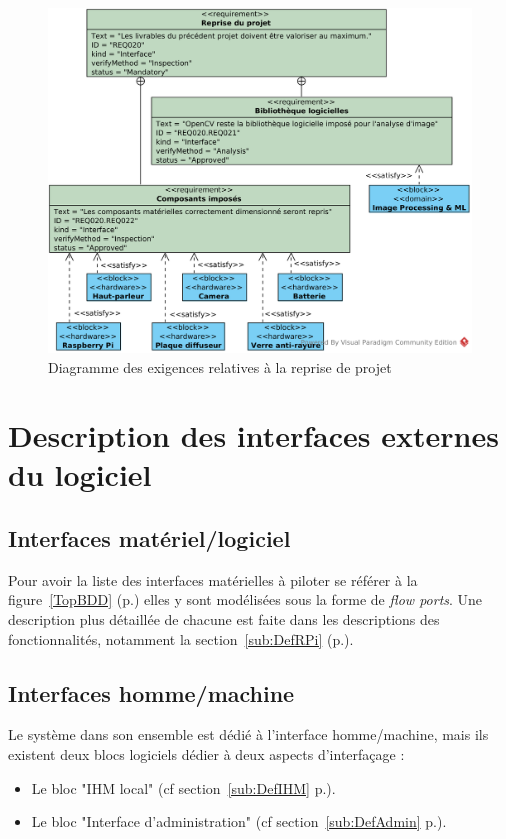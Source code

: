 \begin{figure}[H]
    \centering
    \includegraphics[scale=0.75]{img/SysML_Project_RD.png}
    \caption{Diagramme des exigences relatives à la reprise de projet}
    \label{RDProject}
\end{figure}


\section{Description des interfaces externes du logiciel}

		\subsection{Interfaces matériel/logiciel}

Pour avoir la liste des interfaces matérielles à piloter se référer à la figure~\ref{TopBDD} (p.\pageref{TopBDD}) elles y sont modélisées sous la forme de \emph{flow ports}.
Une description plus détaillée de chacune est faite dans les descriptions des fonctionnalités, notamment la section~\ref{sub:DefRPi} (p.\pageref{sub:DefRPi}).

	\subsection{Interfaces homme/machine}
	
Le système dans son ensemble est dédié à l'interface homme/machine, mais ils existent deux blocs logiciels dédier à deux aspects d'interfaçage :
\begin{itemize}
    \item Le bloc "IHM local" (cf section~\ref{sub:DefIHM} p.\pageref{sub:DefIHM}).
    \item Le bloc "Interface d'administration" (cf section~\ref{sub:DefAdmin} p.\pageref{sub:DefAdmin}).
\end{itemize}

